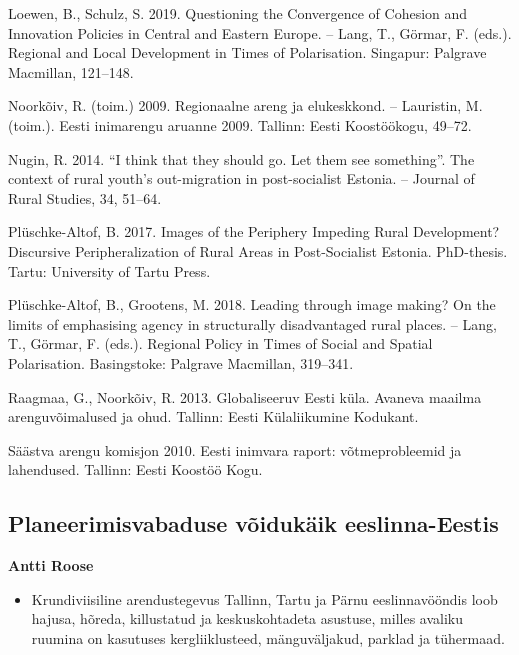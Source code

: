 \documentclass[estonian,]{article}
\providecommand{\tightlist}{%
  \setlength{\itemsep}{0pt}\setlength{\parskip}{0pt}}
\begin{document}
Loewen, B., Schulz, S. 2019. Questioning the Convergence of Cohesion and Innovation Policies in Central and Eastern Europe. -- Lang, T., Görmar, F. (eds.). Regional and Local Development in Times of Polarisation. Singapur: Palgrave Macmillan, 121--148.

Noorkõiv, R. (toim.) 2009. Regionaalne areng ja elukeskkond. -- Lauristin, M. (toim.). Eesti inimarengu aruanne 2009. Tallinn: Eesti Koostöökogu, 49--72.

Nugin, R. 2014. ``I think that they should go. Let them see something''. The context of rural youth's out-migration in post-socialist Estonia. -- Journal of Rural Studies, 34, 51--64.

Plüschke-Altof, B. 2017. Images of the Periphery Impeding Rural Development? Discursive Peripheralization of Rural Areas in Post-Socialist Estonia. PhD-thesis. Tartu: University of Tartu Press.

Plüschke-Altof, B., Grootens, M. 2018. Leading through image making? On the limits of emphasising agency in structurally disadvantaged rural places. -- Lang, T., Görmar, F. (eds.). Regional Policy in Times of Social and Spatial Polarisation. Basingstoke: Palgrave Macmillan, 319--341.

Raagmaa, G., Noorkõiv, R. 2013. Globaliseeruv Eesti küla. Avaneva maailma arenguvõimalused ja ohud. Tallinn: Eesti Külaliikumine Kodukant.

Säästva arengu komisjon 2010. Eesti inimvara raport: võtmeprobleemid ja lahendused. Tallinn: Eesti Koostöö Kogu.

\hypertarget{planeerimisvabaduse-vuxf5idukuxe4ik-eeslinna-eestis}{%
\subsection{Planeerimisvabaduse võidukäik eeslinna-Eestis}\label{planeerimisvabaduse-vuxf5idukuxe4ik-eeslinna-eestis}}

\begin{authors}
\textbf{Antti Roose}
\end{authors}

\begin{points}
\begin{itemize}
\tightlist
\item
  Krundiviisiline arendustegevus Tallinn, Tartu ja Pärnu eeslinnavööndis
  loob hajusa, hõreda, killustatud ja keskuskohtadeta asustuse, milles
  avaliku ruumina on kasutuses kergliiklusteed, mänguväljakud, parklad
  ja tühermaad.
\end{itemize}
\end{points}
\end{document}
